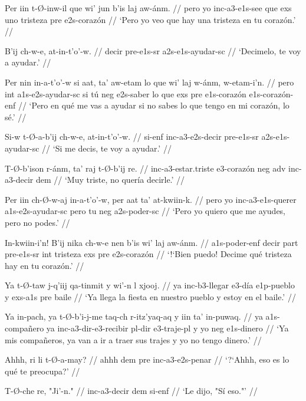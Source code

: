 \documentclass[12pt]{article}
\begin{document}
\ex
\begingl
  \gla Per iin t-\O-inw-il que wi' jun b'is laj aw-\'anm. //
  \glb pero yo inc-a3-e1s-see que exs uno tristeza pre e2s-coraz\'on //
  \glft `Pero yo veo que hay una tristeza en tu coraz\'on.' //
\endgl
\xe

\ex
\begingl
  \gla  B'ij ch-w-e, at-in-t'o'-w. //
  \glb decir pre-e1s-sr a2s-e1s-ayudar-sc //
  \glft `Decimelo, te voy a ayudar.' //
\endgl
\xe

\ex
\begingl
  \gla  Per nin in-a-t'o'-w si aat, ta' aw-etam lo que wi' laj w-\'anm, w-etam-i'n. //
  \glb pero int a1s-e2s-ayudar-sc si t\'u neg e2s-saber lo que exs pre e1s-coraz\'on e1s-coraz\'on-enf //
  \glft `Pero en qu\'e me vas a ayudar si no sabes lo que tengo en mi coraz\'on, lo s\'e.' //
\endgl
\xe

\ex
\begingl
  \gla  Si-w t-\O-a-b'ij ch-w-e, at-in-t'o'-w. //
  \glb  si-enf inc-a3-e2s-decir pre-e1s-sr a2s-e1s-ayudar-sc //
  \glft `Si me decis, te voy a ayudar.' //
\endgl
\xe

\ex
\begingl
  \gla  T-\O-b'ison r-\'anm, ta' raj t-\O-b'ij re. //
  \glb inc-a3-estar.triste e3-coraz\'on neg adv inc-a3-decir dem //
  \glft `Muy triste, no quer\'ia decirle.' //
\endgl
\xe

\ex
\begingl
  \gla Per iin ch-\O-w-aj in-a-t'o'-w, per aat ta' at-kwiin-k. //
  \glb pero yo inc-a3-e1s-querer a1s-e2s-ayudar-sc pero tu neg a2s-poder-sc //
  \glft `Pero yo quiero que me ayudes, pero no podes.' //
\endgl
\xe

\ex
\begingl
  \gla In-kwiin-i'n! B'ij nika ch-w-e nen b'is wi' laj aw-\'anm. //
  \glb a1s-poder-enf decir part pre-e1s-sr int tristeza exs pre e2s-coraz\'on //
  \glft `!`Bien puedo! Decime qu\'e tristeza hay en tu coraz\'on.' //
\endgl
\xe

\ex
\begingl
  \gla  Ya t-\O-taw j-q'iij qa-tinmit y wi'-n l xjooj. //
  \glb ya inc-b3-llegar  e3-d\'ia e1p-pueblo y exs-a1s pre baile //
  \glft `Ya llega la fiesta en nuestro pueblo y estoy en el baile.' //
\endgl
\xe

\ex
\begingl
  \gla  Ya in-pach, ya t-\O-b'i-j-me taq-ch r-itz'yaq-aq y iin ta' in-puwaq. //
  \glb ya a1s-compa\~nero ya inc-a3-dir-e3-recibir pl-dir e3-traje-pl y yo neg e1s-dinero //
  \glft `Ya mis compa\~neros, ya van a ir a traer sus trajes y yo no tengo dinero.' //
\endgl
\xe

\ex
\begingl
  \gla  Ahhh, ri li t-\O-a-may? //
  \glb ahhh dem pre inc-a3-e2s-penar //
  \glft `?`Ahhh, eso es lo qu\'e te preocupa?' //
\endgl
\xe

\ex
\begingl
  \gla  T-\O-che re, "Ji'-n." //
  \glb inc-a3-decir dem si-enf //
  \glft `Le dijo, "S\'i eso."' //
\endgl
\xe
\end{document}

